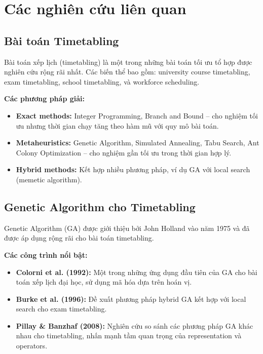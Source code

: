 \section{Các nghiên cứu liên quan}

\subsection{Bài toán Timetabling}
Bài toán xếp lịch (timetabling) là một trong những bài toán tối ưu tổ hợp được nghiên cứu rộng rãi nhất. Các biến thể bao gồm: university course timetabling, exam timetabling, school timetabling, và workforce scheduling.

\textbf{Các phương pháp giải:}
\begin{itemize}
    \item \textbf{Exact methods:} Integer Programming, Branch and Bound -- cho nghiệm tối ưu nhưng thời gian chạy tăng theo hàm mũ với quy mô bài toán.
    \item \textbf{Metaheuristics:} Genetic Algorithm, Simulated Annealing, Tabu Search, Ant Colony Optimization -- cho nghiệm gần tối ưu trong thời gian hợp lý.
    \item \textbf{Hybrid methods:} Kết hợp nhiều phương pháp, ví dụ GA với local search (memetic algorithm).
\end{itemize}

\subsection{Genetic Algorithm cho Timetabling}
Genetic Algorithm (GA) được giới thiệu bởi John Holland vào năm 1975 và đã được áp dụng rộng rãi cho bài toán timetabling.

\textbf{Các công trình nổi bật:}
\begin{itemize}
    \item \textbf{Colorni et al. (1992):} Một trong những ứng dụng đầu tiên của GA cho bài toán xếp lịch đại học, sử dụng mã hóa dựa trên hoán vị.
    \item \textbf{Burke et al. (1996):} Đề xuất phương pháp hybrid GA kết hợp với local search cho exam timetabling.
    \item \textbf{Pillay \& Banzhaf (2008):} Nghiên cứu so sánh các phương pháp GA khác nhau cho timetabling, nhấn mạnh tầm quan trọng của representation và operators.
\end{itemize}

